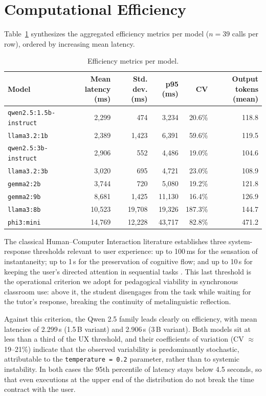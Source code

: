 \documentclass{sbc2023}%
\begin{document}
\section{Computational Efficiency}
\label{sec:efficiency}

Table~\ref{tab:efficiency} synthesizes the aggregated efficiency metrics per model ($n=39$ calls per row), ordered by increasing mean latency.

\begin{table}
\caption{Efficiency metrics per model.}
\centering
\begin{tabular}{@{}lrrrrr@{}}
\hline\hline
Model & Mean latency (ms) & Std. dev. (ms) & p95 (ms) & CV & Output tokens (mean) \\
\hline
\texttt{qwen2.5:1.5b-instruct} & 2,299 & 474 & 3,234 & 20.6\% & 118.8 \\
\texttt{llama3.2:1b} & 2,389 & 1,423 & 6,391 & 59.6\% & 119.5 \\
\texttt{qwen2.5:3b-instruct} & 2,906 & 552 & 4,486 & 19.0\% & 104.6 \\
\texttt{llama3.2:3b} & 3,020 & 695 & 4,721 & 23.0\% & 108.9 \\
\texttt{gemma2:2b} & 3,744 & 720 & 5,080 & 19.2\% & 121.8 \\
\texttt{gemma2:9b} & 8,681 & 1,425 & 11,130 & 16.4\% & 126.9 \\
\texttt{llama3:8b} & 10,523 & 19,708 & 19,326 & 187.3\% & 144.7 \\
\texttt{phi3:mini} & 14,769 & 12,228 & 43,717 & 82.8\% & 471.2 \\
\hline\hline
\end{tabular}
\label{tab:efficiency}
\end{table}

The classical Human--Computer Interaction literature establishes three system-response thresholds relevant to user experience: up to 100\,ms for the sensation of instantaneity; up to 1\,s for the preservation of cognitive flow; and up to 10\,s for keeping the user's directed attention in sequential tasks \citep{nielsen1993usability,card1991infovis}. This last threshold is the operational criterion we adopt for pedagogical viability in synchronous classroom use: above it, the student disengages from the task while waiting for the tutor's response, breaking the continuity of metalinguistic reflection.

Against this criterion, the Qwen 2.5 family leads clearly on efficiency, with mean latencies of 2.299\,s (1.5\,B variant) and 2.906\,s (3\,B variant). Both models sit at less than a third of the UX threshold, and their coefficients of variation (CV $\approx$ 19--21\%) indicate that the observed variability is predominantly stochastic, attributable to the \texttt{temperature = 0.2} parameter, rather than to systemic instability. In both cases the 95th percentile of latency stays below 4.5 seconds, so that even executions at the upper end of the distribution do not break the time contract with the user.
\end{document}
